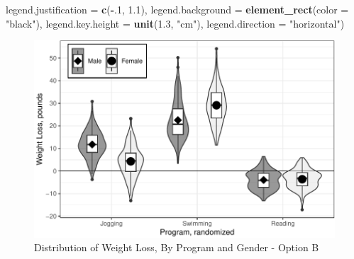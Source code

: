 \documentclass[
]{article}
\newenvironment{Shaded}{\begin{snugshade}}{\end{snugshade}}
\newcommand{\AttributeTok}[1]{\textcolor[rgb]{0.13,0.29,0.53}{#1}}
\newcommand{\DecValTok}[1]{\textcolor[rgb]{0.00,0.00,0.81}{#1}}
\newcommand{\FloatTok}[1]{\textcolor[rgb]{0.00,0.00,0.81}{#1}}
\newcommand{\FunctionTok}[1]{\textcolor[rgb]{0.13,0.29,0.53}{\textbf{#1}}}
\newcommand{\NormalTok}[1]{#1}
\newcommand{\SpecialCharTok}[1]{\textcolor[rgb]{0.81,0.36,0.00}{\textbf{#1}}}
\newcommand{\StringTok}[1]{\textcolor[rgb]{0.31,0.60,0.02}{#1}}
\begin{document}
\begin{Shaded}
\begin{Highlighting}[]
        \AttributeTok{legend.justification =} \FunctionTok{c}\NormalTok{(}\SpecialCharTok{{-}}\NormalTok{.}\DecValTok{1}\NormalTok{, }\FloatTok{1.1}\NormalTok{),}
        \AttributeTok{legend.background =} \FunctionTok{element\_rect}\NormalTok{(}\AttributeTok{color =} \StringTok{"black"}\NormalTok{),}
        \AttributeTok{legend.key.height =} \FunctionTok{unit}\NormalTok{(}\FloatTok{1.3}\NormalTok{, }\StringTok{"cm"}\NormalTok{),}
        \AttributeTok{legend.direction =} \StringTok{"horizontal"}\NormalTok{)}
\end{Highlighting}
\end{Shaded}

\begin{figure}[hb]

\includegraphics{Appendix_ex_weightloss_files/figure-latex/unnamed-chunk-35-1} \hfill{}

\caption{Distribution of Weight Loss, By Program and Gender - Option B}\label{fig:unnamed-chunk-35}
\end{figure}

\clearpage
\end{document}
